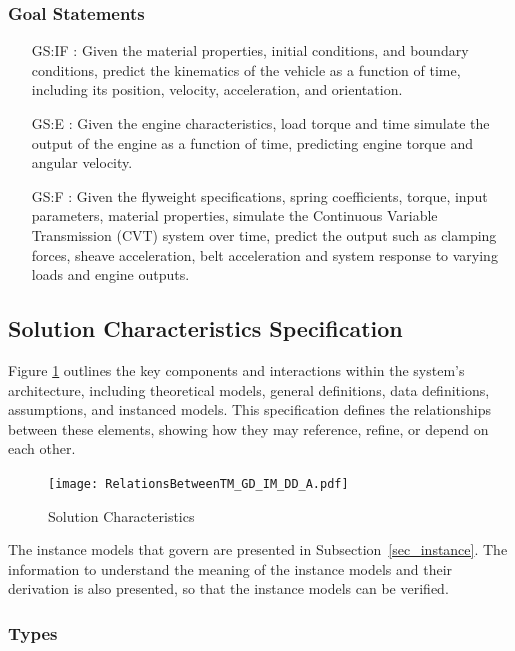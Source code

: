 \documentclass[12pt]{article}
\begin{document}
\subsubsection{Goal Statements}

\begin{itemize}

  \item[GS:IF \label{GS:IF}:]  Given the material properties, initial conditions, and boundary conditions, predict the kinematics of the vehicle as a function of time, including its position, velocity, acceleration, and orientation.
  \item[GS:E \label{GS:E}:]  Given the engine characteristics, load torque and time simulate the output of the engine as a function of time, predicting engine torque and angular velocity.
  \item[GS:F \label{GS:F}:]  Given the flyweight specifications, spring coefficients, torque, input parameters, material properties, simulate the Continuous Variable Transmission (CVT) system over time, predict the output such as clamping forces, sheave acceleration, belt acceleration and system response to varying loads and engine outputs.

\end{itemize}

\subsection{Solution Characteristics Specification}

Figure \ref{Fig_SolutionCharacteristics} outlines the key components and interactions within the system's architecture, 
including theoretical models, general definitions, data definitions, assumptions, and instanced models.
This specification defines the relationships between these elements, showing how they may reference, refine, or depend on each other. 

\begin{figure}[H]
  \texttt{[image: RelationsBetweenTM\_GD\_IM\_DD\_A.pdf]}
  \caption{Solution Characteristics}
  \label{Fig_SolutionCharacteristics}
\end{figure}

The instance models that govern \progname{} are presented in
Subsection~\ref{sec_instance}.  The information to understand the meaning of the
instance models and their derivation is also presented, so that the instance
models can be verified.

\subsubsection{Types}
\end{document}
